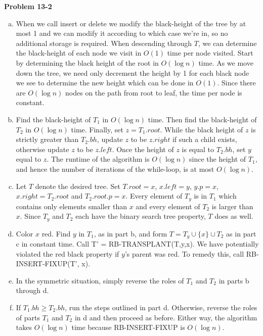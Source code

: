 \documentclass{article}
\begin{document}
\noindent\textbf{Problem 13-2}\\
\begin{enumerate}[a.]
\item When we call insert or delete we modify the black-height of the tree by at most 1 and we can modify it according to which case we're in, so no additional storage is required. When descending through $T$, we can determine the black-height of each node we visit in $O(1)$ time per node visited.  Start by determining the black height of the root in $O(\log n)$ time.  As we move down the tree, we need only decrement the height by 1 for each black node we see to determine the new height which can be done in $O(1)$.  Since there are $O(\log n)$ nodes on the path from root to leaf, the time per node is constant. \\

 \item Find the black-height of $T_1$ in $O(\log n)$ time. Then find the black-height of $T_2$ in $O(\log n)$ time.  Finally, set $z = T_1.root$.  While the black height of $z$ is strictly greater than $T_2.bh$, update $z$ to be $z.right$ if such a child exists, otherwise update $z$ to be $z.left$.  Once the height of $z$ is equal to $T_2.bh$, set $y$ equal to $z$.  The runtime of the algorithm is $O(\log n)$ since the height of $T_1$, and hence the number of iterations of the while-loop, is at most $O(\log n)$.\\

\item Let $T$ denote the desired tree.  Set $T.root = x$, $x.left = y$, $y.p = x$, $x.right = T_2.root$ and $T_2.root.p = x$.  Every element of $T_y$ is in $T_1$ which contains only elements smaller than $x$ and every element of $T_2$ is larger than $x$.  Since $T_y$ and $T_2$ each have the binary search tree property, $T$ does as well. \\

\item Color $x$ red.  Find $y$ in $T_1$, as in part b, and form $T = T_y \cup \{ x \} \cup T_2$ as in part c in constant time.  Call T' = RB-TRANSPLANT(T,y,x).  We have potentially violated the red black property if $y$'s parent was red.  To remedy this, call RB-INSERT-FIXUP(T', x).\\

\item In the symmetric situation, simply reverse the roles of $T_1$ and $T_2$ in parts b through d. \\

\item  If $T_1.bh \geq T_2.bh$, run the steps outlined in part d.  Otherwise, reverse the roles of parts $T_1$ and $T_2$ in d and then proceed as before.  Either way, the algorithm takes $O(\log n)$ time because RB-INSERT-FIXUP is $O(\log n)$.

\end{enumerate}
\end{document}
